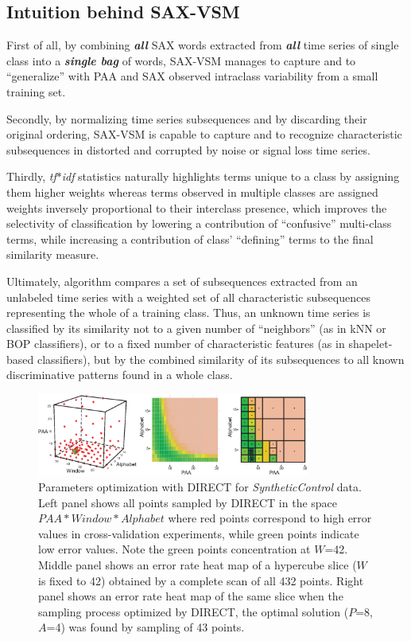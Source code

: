 \documentclass[conference]{IEEEtran}
\begin{document}
\subsection{Intuition behind SAX-VSM}
First of all, by combining \textit{\textbf{all}} SAX words extracted from 
\textit{\textbf{all}} time series of single class into a \textit{\textbf{single bag}} of 
words, SAX-VSM manages to capture and to ``generalize'' with PAA and SAX 
observed intraclass variability from a small training set.  

Secondly, by normalizing time series subsequences and by discarding their original 
ordering, SAX-VSM is capable to capture and to recognize characteristic 
subsequences in distorted and corrupted by noise or signal loss time series. 

Thirdly, \textit{tf$\ast$idf} statistics naturally highlights terms unique to a
class by assigning them higher weights whereas terms observed in multiple classes are 
assigned weights inversely proportional to their interclass presence, which 
improves the selectivity of classification by lowering a contribution of ``confusive'' 
multi-class terms, while increasing a contribution of class' ``defining'' terms to the
final similarity measure.

Ultimately, algorithm compares a set of subsequences extracted from an unlabeled 
time series with a weighted set of all characteristic subsequences representing the whole 
of a training class. 
Thus, an unknown time series is classified by its similarity not to a given number of 
``neighbors'' (as in kNN or BOP classifiers), or to a fixed number of characteristic features 
(as in shapelet-based classifiers), but by the combined similarity of its subsequences to 
all known discriminative patterns found in a whole class.

\begin{figure}[t]
   \centering
   \vspace{0.05cm}
   \includegraphics[width=90mm]{figures/figure_direct.eps}
   \caption{Parameters optimization with DIRECT for \textit{SyntheticControl} data. 
   Left panel shows all points sampled by DIRECT in the space $PAA*Window*Alphabet$ where
   red points correspond to high error values in cross-validation experiments, 
   while green points indicate low error values. 
   Note the green points concentration at $W$=42. 
   Middle panel shows an error rate heat map of a hypercube slice ($W$ is fixed to 42)
   obtained by a complete scan of all 432 points. 
   Right panel shows an error rate heat map of the same slice when 
   the sampling process optimized by DIRECT, 
   the optimal solution ($P$=8,$A$=4) was found by sampling of 43 points.}
   \vspace{-0.15cm}
   \label{fig:direct-sampling}
\end{figure}
\end{document}
